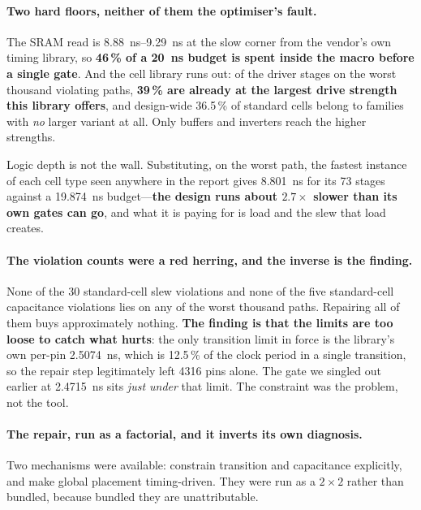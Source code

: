 \documentclass[11pt,a4paper]{article}
\begin{document}
\paragraph{Two hard floors, neither of them the optimiser's fault.}
The SRAM read is \SIrange{8.88}{9.29}{\nano\second} at the slow corner
from the vendor's own timing library, so \textbf{46\,\% of a
\SI{20}{\nano\second} budget is spent inside the macro before a single
gate}. And the cell library runs out: of the driver stages on the worst
thousand violating paths, \textbf{39\,\% are already at the largest
drive strength this library offers}, and design-wide 36.5\,\% of
standard cells belong to families with \emph{no} larger variant at all.
Only buffers and inverters reach the higher strengths.

Logic depth is not the wall. Substituting, on the worst path, the
fastest instance of each cell type seen anywhere in the report gives
\SI{8.801}{\nano\second} for its 73 stages against a
\SI{19.874}{\nano\second} budget---\textbf{the design runs about
$2.7\times$ slower than its own gates can go}, and what it is paying for
is load and the slew that load creates.

\paragraph{The violation counts were a red herring, and the inverse is
the finding.}
None of the 30 standard-cell slew violations and none of the five
standard-cell capacitance violations lies on any of the worst thousand
paths. Repairing all of them buys approximately nothing. \textbf{The
finding is that the limits are too loose to catch what hurts}: the only
transition limit in force is the library's own per-pin
\SI{2.5074}{\nano\second}, which is 12.5\,\% of the clock period in a
single transition, so the repair step legitimately left \num{4316} pins
alone. The gate we singled out earlier at \SI{2.4715}{\nano\second} sits
\emph{just under} that limit. The constraint was the problem, not the
tool.

\paragraph{The repair, run as a factorial, and it inverts its own
diagnosis.}
Two mechanisms were available: constrain transition and capacitance
explicitly, and make global placement timing-driven. They were run as a
$2\times2$ rather than bundled, because bundled they are unattributable.
\end{document}
